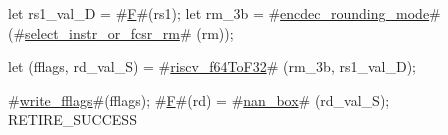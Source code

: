 let rs1_val_D = #\hyperref[sailRISCVzF]{F}#(rs1);
let rm_3b     = #\hyperref[sailRISCVzencdeczyroundingzymode]{encdec\_rounding\_mode}# (#\hyperref[sailRISCVzselectzyinstrzyorzyfcsrzyrm]{select\_instr\_or\_fcsr\_rm}#  (rm));

let (fflags, rd_val_S) = #\hyperref[sailRISCVzriscvzyf64ToF32]{riscv\_f64ToF32}# (rm_3b, rs1_val_D);

#\hyperref[sailRISCVzwritezyfflags]{write\_fflags}#(fflags);
#\hyperref[sailRISCVzF]{F}#(rd) = #\hyperref[sailRISCVznanzybox]{nan\_box}# (rd_val_S);
RETIRE_SUCCESS
